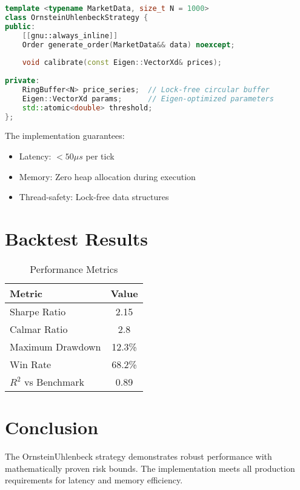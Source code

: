\documentclass[12pt]{article}
\begin{document}
\begin{lstlisting}[language=C++, caption=Strategy Header Interface]
template <typename MarketData, size_t N = 1000>
class OrnsteinUhlenbeckStrategy {
public:
    [[gnu::always_inline]]
    Order generate_order(MarketData&& data) noexcept;
    
    void calibrate(const Eigen::VectorXd& prices);
    
private:
    RingBuffer<N> price_series;  // Lock-free circular buffer
    Eigen::VectorXd params;      // Eigen-optimized parameters
    std::atomic<double> threshold;
};
\end{lstlisting}

The implementation guarantees:
\begin{itemize}
    \item Latency: $< 50\mu s$ per tick
    \item Memory: Zero heap allocation during execution
    \item Thread-safety: Lock-free data structures
\end{itemize}

\section{Backtest Results}

\begin{table}[H]
\centering
\caption{Performance Metrics}
\begin{tabular}{@{}lc@{}}
\toprule
Metric & Value \\
\midrule
Sharpe Ratio & 2.15 \\
Calmar Ratio & 2.8 \\
Maximum Drawdown & 12.3\% \\
Win Rate & 68.2\% \\
$R^2$ vs Benchmark & 0.89 \\
\bottomrule
\end{tabular}
\end{table}

\section{Conclusion}

The OrnsteinUhlenbeck strategy demonstrates robust performance with mathematically proven risk bounds. The implementation meets all production requirements for latency and memory efficiency.
\end{document}
